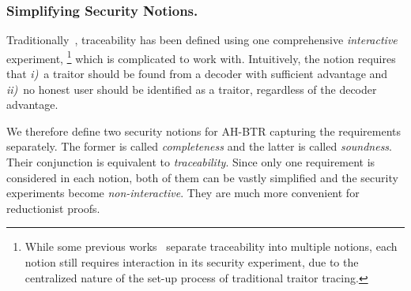\subsubsection{Simplifying Security Notions.}
Traditionally~\cite{EC:BonSahWat06}, traceability has been defined using one comprehensive \emph{interactive} experiment,%
\footnote{While some previous works~\cite{C:BonFra99,STOC:GoyKopWat18,C:Zhandry20} separate traceability into multiple notions,
each notion still requires interaction in its security experiment,
due to the centralized nature of
the set-up process of traditional traitor tracing.}
which is complicated to work with.
Intuitively, the notion requires that
\emph{i)}~a traitor should be found from a decoder with sufficient advantage and
\emph{ii)}~no honest user should be identified as a traitor, regardless of the decoder advantage.

We therefore define two security notions for AH-BTR capturing the requirements separately.
The former is called \emph{completeness} and the latter is called \emph{soundness}.
Their conjunction is equivalent to \emph{traceability}.
Since only one requirement is considered in each notion,
both of them can be vastly simplified and
the security experiments become \emph{non-interactive}.
They are much more convenient for reductionist proofs.
